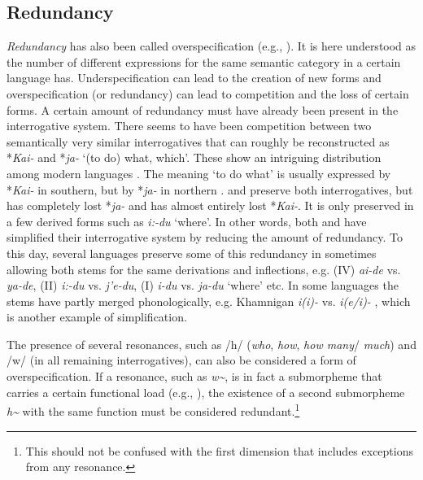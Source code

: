\documentclass[output=paper,hidelinks]{langscibook}
\begin{document}
\subsection{Redundancy} 
\textit{Redundancy} has also been called overspecification (e.g., \citealt[21--28]{McWhorter2007}). It is here understood as the number of different expressions for the same semantic category in a certain language has. Underspecification can lead to the creation of new forms and overspecification (or redundancy) can lead to competition and the loss of certain forms. A certain amount of redundancy must have already been present in the  interrogative system. There seems to have been competition between two semantically very similar interrogatives that can roughly be reconstructed as *\textit{Kai-} and *\textit{ja-} `(to do) what, which'. These show an intriguing distribution among modern  languages \citep[315f.]{Hölzl2018b}. The meaning `to do what' is usually expressed by *\textit{Kai-} in southern, but by *\textit{ja-} in northern .  and  preserve both interrogatives, but  has completely lost *\textit{ja-} and  has almost entirely lost *\textit{Kai-}. It is only preserved in a few derived forms such as  \textit{i:-du} `where'. In other words, both  and  have simplified their interrogative system by reducing the amount of redundancy. To this day, several languages preserve some of this redundancy in sometimes allowing both stems for the same derivations and inflections, e.g.  (IV) \textit{ai-de} vs. \textit{ya-de},  (II) \textit{i:-du} vs. \textit{j’e-du},  (I) \textit{i-du} vs. \textit{ja-du} `where' etc. In some  languages the stems have partly merged phonologically, e.g. Khamnigan  \textit{i(i)-} vs. \textit{i(e/i)-} \citep{Janhunen1991}, which is another example of simplification.

The presence of several resonances, such as  /h/ (\textit{who}, \textit{how}, \textit{how many}/ \textit{much}) and /w/ (in all remaining interrogatives), can also be considered a form of overspecification. If a resonance, such as  \textit{w\textasciitilde}, is in fact a submorpheme that carries a certain functional load (e.g., \citealt{Langacker2001, Mackenzie2009}), the existence of a second submorpheme \textit{h\textasciitilde} with the same function must be considered redundant.\footnote{This should not be confused with the first dimension that includes exceptions from any resonance.}
\end{document}
